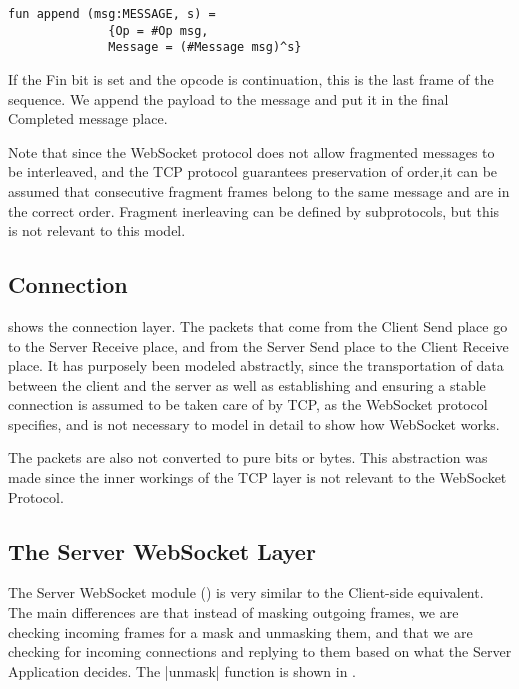 			\begin{lstlisting}[label=lst:append,caption=append,gobble=3,float]
			fun append (msg:MESSAGE, s) = 
			  {Op = #Op msg,
			  Message = (#Message msg)^s}
			\end{lstlisting}
			
			If the Fin bit is set and the opcode is continuation, this is the last frame
			of the sequence. We append the payload to the message and put it in the final
			Completed message place. 
			
			Note that since the WebSocket protocol does not allow fragmented messages to
			be interleaved, and the TCP protocol guarantees preservation of order,it
			can be assumed that consecutive fragment frames belong to the same message
			and are in the correct order.
			Fragment inerleaving can be defined by subprotocols, but this is not
			relevant to this model.
			
\subsection{Connection}

	
	 shows the connection layer. The
	packets that come from the Client Send place go to the Server Receive place, and from the
	Server Send place to the Client Receive place. It has purposely been modeled
	abstractly, since the transportation of data between the client and the server
	as well as establishing and ensuring a stable connection is assumed to be taken
	care of by TCP, as the WebSocket protocol specifies, and is not necessary to
	model in detail to show how WebSocket works.
	
	The packets are also not converted to pure bits or bytes. This abstraction was
	made since the inner workings of the TCP layer is not relevant to the WebSocket
	Protocol.

\subsection{The Server WebSocket Layer}
	
	
	The Server WebSocket module () is very similar to the Client-side
	equivalent.
	The main differences are that instead of masking outgoing frames, we are checking
	incoming frames for a mask and unmasking them, and that we are checking for
	incoming connections and replying to them based on what the Server Application
	decides. The |unmask| function is shown in .
	 
